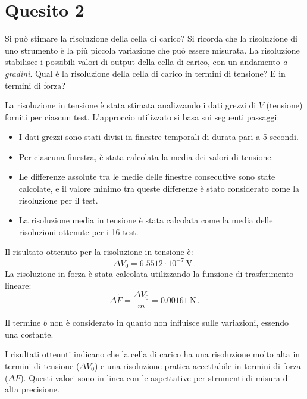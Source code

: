 \newpage

\section*{Quesito 2}

Si può stimare la risoluzione della cella di carico? Si ricorda che la risoluzione di uno strumento è la più piccola variazione che può essere misurata. La risoluzione stabilisce i possibili valori di output della cella di carico, con un andamento \emph{a gradini}. Qual è la risoluzione della cella di carico in termini di tensione? E in termini di forza?

\NotionDivider

La risoluzione in tensione è stata stimata analizzando i dati grezzi di \( V \) (tensione) forniti per ciascun test. L'approccio utilizzato si basa sui seguenti passaggi:
\begin{itemize}
    \item I dati grezzi sono stati divisi in finestre temporali di durata pari a 5 secondi.
    \item Per ciascuna finestra, è stata calcolata la media dei valori di tensione.
    \item Le differenze assolute tra le medie delle finestre consecutive sono state calcolate, e il valore minimo tra queste differenze è stato considerato come la risoluzione per il test.
    \item La risoluzione media in tensione è stata calcolata come la media delle risoluzioni ottenute per i 16 test.
\end{itemize}

Il risultato ottenuto per la risoluzione in tensione è:
\[
\Delta V_0 = 6.5512 \cdot 10^{-7}~ \text{V}\,.
\]
La risoluzione in forza è stata calcolata utilizzando la funzione di trasferimento lineare:
\[
\Delta \tilde{F} = \frac{\Delta V_0}{m}=0.00161~\text{N}\,.
\]

Il termine \(b\) non è considerato in quanto non influisce sulle variazioni, essendo una costante.

I risultati ottenuti indicano che la cella di carico ha una risoluzione molto alta in termini di tensione (\( \Delta V_0 \)) e una risoluzione pratica accettabile in termini di forza (\( \Delta \tilde F \)). Questi valori sono in linea con le aspettative per strumenti di misura di alta precisione.




